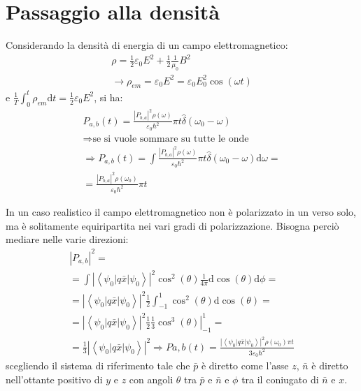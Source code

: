 \section{Passaggio alla densità} %
Considerando la densità di energia di un campo elettromagnetico:
\begin{equation}\begin{split}
\rho=\frac{1}{2}\varepsilon_0E^2+\frac{1}{2}\frac{1}{\mu_0}B^2\\
\rightarrow \rho_{em}=\varepsilon_0E^2=\varepsilon_0E^2_0\cos{\left(\omega t\right)}
\end{split}\end{equation}
e $\frac{1}{T}\int_0^t{\rho_{em}\textrm{d}t}=\frac{1}{2}\varepsilon_0E^2$, si ha:
\begin{equation}\begin{split}
P_{a,b}\left(t\right)=\frac{|P_{b,a}|^2\rho\left(\omega \right)}{\varepsilon_0\hbar ^2}\pi t\hat\delta\left(\omega _0-\omega \right) \\
\Longrightarrow \textrm{se si vuole sommare su tutte le onde}\\
\Longrightarrow P_{a,b}\left(t\right)=\int{\frac{|P_{b,a}|^2\rho\left(\omega \right)}{\varepsilon_0\hbar ^2}\pi t\hat\delta\left(\omega _0-\omega \right)\textrm{d}\omega }= \\
=\frac{|P_{b,a}|^2\rho\left(\omega_0 \right)}{\varepsilon_0\hbar ^2}\pi t
\end{split}\end{equation}

In un caso realistico il campo elettromagnetico non è polarizzato in un verso solo, ma è solitamente equiripartita nei vari gradi di polarizzazione. Bisogna perciò mediare nelle varie direzioni:
\begin{equation}\begin{split}
\left|P_{a,b}\right|^2=\\
=\int{\left|\left\langle \psi _0|q\bar x|\psi _0 \right\rangle\right|^2\cos^2{\left(\theta\right)}\frac{1}{4\pi}\textrm{d}\cos{\left(\theta\right)}\textrm{d}\phi}=\\
=\left|\left\langle \psi _0|q\bar x|\psi _0 \right\rangle\right|^2\frac{1}{2}\int_{-1}^1{\cos^2{\left(\theta\right)}\textrm{d}\cos{\left(\theta\right)}}=\\
=\left|\left\langle \psi _0|q\bar x|\psi _0 \right\rangle\right|^2\frac{1}{2}\left.\frac{1}{3}\cos^3{\left(\theta\right)}\right|_{-1}^1=\\
=\frac{1}{3}\left|\left\langle \psi _0|q\bar x|\psi _0 \right\rangle\right|^2
\Longrightarrow P{a,b}\left(t\right)=\frac{\left|\left\langle \psi _0|q\bar x|\psi _0 \right\rangle\right|^2\rho\left(\omega _0\right)\pi t}{3\varepsilon_0\hbar ^2}
\end{split}\end{equation}
scegliendo il sistema di riferimento tale che $\bar p$ è diretto come l'asse $z$, $\bar n$ è diretto nell'ottante positivo di $y$ e $z$ con angoli $\theta$ tra $\bar p$ e $\bar n$ e $\phi$ tra il coniugato di $\bar n$ e $x$.